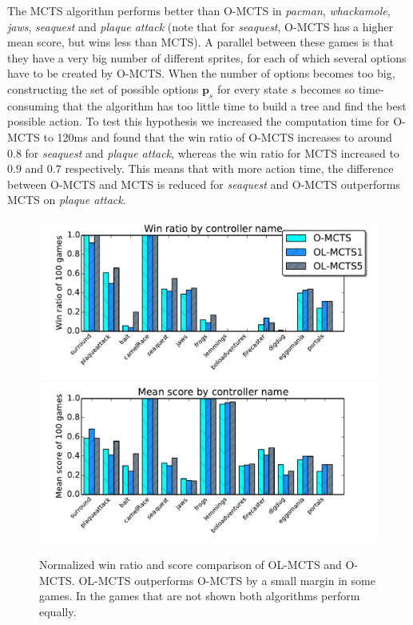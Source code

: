 The MCTS algorithm performs better than O-MCTS in \textit{pacman},
\textit{whackamole}, \textit{jaws}, \textit{seaquest} and \textit{plaque attack}
(note that for \textit{seaquest}, O-MCTS has a higher mean score, but wins less
than MCTS). A parallel between these games is that they have a very
big number of different sprites, for each of which several options have to be
created by O-MCTS\@. When the number of options becomes too big, constructing the
set of possible options $\mathbf{p}_s$ for every state $s$ becomes so
time-consuming that the algorithm has too little time to build a tree and find
the best possible action. To test this hypothesis we increased the computation
time for O-MCTS to 120ms and found that the win ratio of O-MCTS increases to
around $0.8$ for \textit{seaquest} and \textit{plaque attack}, whereas the win
ratio for MCTS increased to $0.9$ and $0.7$ respectively. This means that with
more action time, the difference between O-MCTS and MCTS is reduced for
\textit{seaquest} and O-MCTS outperforms MCTS on \textit{plaque attack}.

\begin{figure}
	\centering
	\includegraphics[width=\columnwidth]{includes/winsOLMCTS}
	\centering
	\includegraphics[width=\columnwidth]{includes/scoresOLMCTS}
	\vspace{-.8cm}
	\caption{Normalized win ratio and score comparison of OL-MCTS and O-MCTS\@.
	OL-MCTS outperforms O-MCTS by a small margin in some games. In the games
	that are not shown both algorithms perform equally.}
\label{fig:scores-olmcts}
\end{figure}


